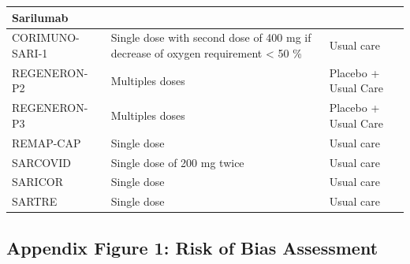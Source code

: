 \documentclass[
  12pt,
]{article}
\begin{document}
\begin{landscape}
\begin{longtable}{lll}
\midrule
\multicolumn{1}{l}{Sarilumab} \\ 
\midrule
CORIMUNO-SARI-1 & Single dose with second dose of 400 mg if decrease of oxygen requirement < 50 \% & Usual care \\ 
REGENERON-P2 & Multiples doses & Placebo + Usual Care \\ 
REGENERON-P3 & Multiples doses & Placebo + Usual Care \\ 
REMAP-CAP & Single dose & Usual care \\ 
SARCOVID & Single dose of 200 mg twice & Usual care \\ 
SARICOR & Single dose & Usual care \\ 
SARTRE & Single dose & Usual care \\ 
 \bottomrule
\end{longtable}

\end{landscape}

\restoregeometry

\newpage

\hypertarget{appendix-figure-1-risk-of-bias-assessment}{%
\subsection{Appendix Figure 1: Risk of Bias
Assessment}\label{appendix-figure-1-risk-of-bias-assessment}}
\end{document}
